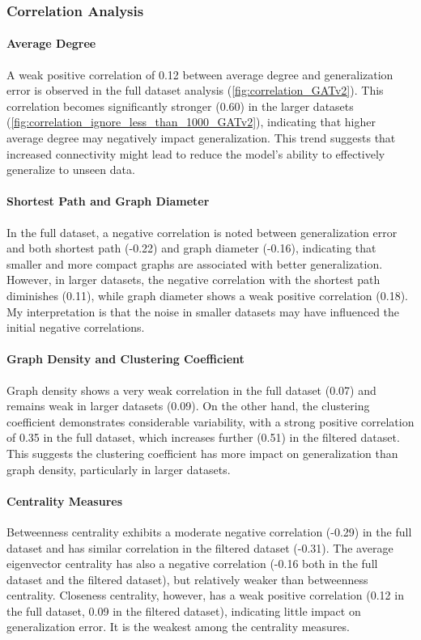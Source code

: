 \subsubsection{Correlation Analysis}

\paragraph{Average Degree}
A weak positive correlation of 0.12 between average degree and generalization error is observed in the full dataset analysis (\ref{fig:correlation_GATv2}). This correlation becomes significantly stronger (0.60) in the larger datasets (\ref{fig:correlation_ignore_less_than_1000_GATv2}), indicating that higher average degree may negatively impact generalization. This trend suggests that increased connectivity might lead to reduce the model's ability to effectively generalize to unseen data.

\paragraph{Shortest Path and Graph Diameter}
In the full dataset, a negative correlation is noted between generalization error and both shortest path (-0.22) and graph diameter (-0.16), indicating that smaller and more compact graphs are associated with better generalization. However, in larger datasets, the negative correlation with the shortest path diminishes (0.11), while graph diameter shows a weak positive correlation (0.18). My interpretation is that the noise in smaller datasets may have influenced the initial negative correlations.

\paragraph{Graph Density and Clustering Coefficient}
Graph density shows a very weak correlation in the full dataset (0.07) and remains weak in larger datasets (0.09). On the other hand, the clustering coefficient demonstrates considerable variability, with a strong positive correlation of 0.35 in the full dataset, which increases further (0.51) in the filtered dataset. This suggests the clustering coefficient has more impact on generalization than graph density, particularly in larger datasets.

\paragraph{Centrality Measures}
Betweenness centrality exhibits a moderate negative correlation (-0.29) in the full dataset and has similar correlation in the filtered dataset (-0.31). The average eigenvector centrality has also a negative correlation (-0.16 both in the full dataset and the filtered dataset), but relatively weaker than betweenness centrality. Closeness centrality, however, has a weak positive correlation (0.12 in the full dataset, 0.09 in the filtered dataset), indicating little impact on generalization error. It is the weakest among the centrality measures. 

